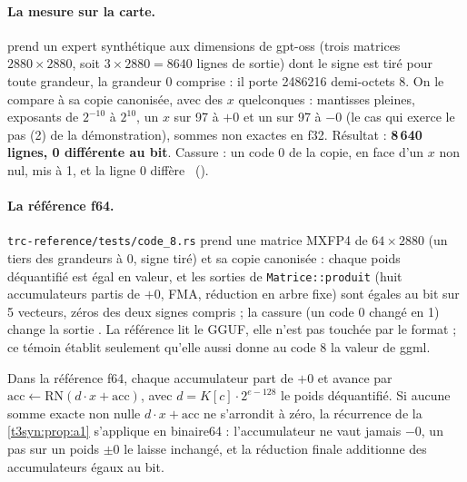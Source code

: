 \begin{figure}[tbp]
\centering
\GrapheCodonAccumulateur
{}
\label{fig:t3-codon-accumulateur}
\end{figure}

\paragraph{La mesure sur la carte.}  prend un expert synthétique aux dimensions de gpt-oss (trois matrices $2880 \times 2880$, soit $3 \times 2880 = 8640$ lignes de sortie) dont le signe est tiré pour toute grandeur, la grandeur 0 comprise : il porte \num{2486216} demi-octets 8. On le compare à sa copie canonisée, avec des $x$ quelconques : mantisses pleines, exposants de $2^{-10}$ à $2^{10}$, un $x$ sur 97 à $+0$ et un sur 97 à $-0$ (le cas qui exerce le pas (2) de la démonstration), sommes non exactes en f32. Résultat : \textbf{8\,640 lignes, 0 différente au bit}. Cassure : un code 0 de la copie, en face d'un $x$ non nul, mis à 1, et la ligne 0 diffère \mes~().

\paragraph{La référence f64.} \texttt{trc-reference/tests/code\_8.rs} prend une matrice MXFP4 de $64 \times 2880$ (un tiers des grandeurs à 0, signe tiré) et sa copie canonisée : chaque poids déquantifié est égal en valeur, et les sorties de \texttt{Matrice::produit} (huit accumulateurs partis de $+0$, FMA, réduction en arbre fixe) sont égales au bit sur 5 vecteurs, zéros des deux signes compris ; la cassure (un code 0 changé en 1) change la sortie \mes. La référence lit le GGUF, elle n'est pas touchée par le format ; ce témoin établit seulement qu'elle aussi donne au code 8 la valeur de ggml.

\begin{corollaire}[La référence f64]\label{t3cod:cor:f64}
Dans la référence f64, chaque accumulateur part de $+0$ et avance par $\mathrm{acc} \leftarrow \mathrm{RN}(d \cdot x + \mathrm{acc})$, avec $d = K[c] \cdot 2^{e-128}$ le poids déquantifié. Si aucune somme exacte non nulle $d\cdot x + \mathrm{acc}$ ne s'arrondit à zéro, la récurrence de la \cref{t3syn:prop:a1} s'applique en binaire64 : l'accumulateur ne vaut jamais $-0$, un pas sur un poids $\pm 0$ le laisse inchangé, et la réduction finale additionne des accumulateurs égaux au bit.
\end{corollaire}

